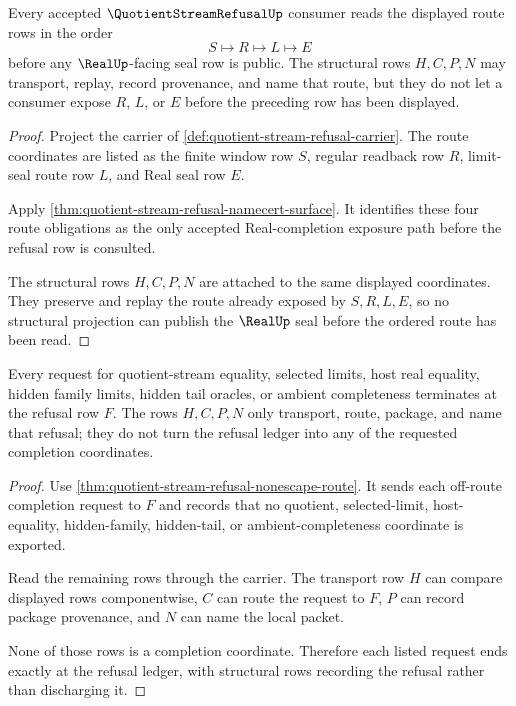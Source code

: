 \begin{theorem}
\label{thm:quotient-stream-refusal-route-exposure}
Every accepted $\QuotientStreamRefusalUp$ consumer reads the displayed route rows in the order
$$
S \longmapsto R \longmapsto L \longmapsto E
$$
before any $\RealUp$-facing seal row is public. The structural rows $H,C,P,N$ may transport, replay, record provenance, and name that route, but they do not let a consumer expose $R$, $L$, or $E$ before the preceding row has been displayed.
\end{theorem}
\begin{proof}
Project the carrier of \autoref{def:quotient-stream-refusal-carrier}. The route coordinates are listed as the finite window row $S$, regular readback row $R$, limit-seal route row $L$, and Real seal row $E$.

Apply \autoref{thm:quotient-stream-refusal-namecert-surface}. It identifies these four route obligations as the only accepted Real-completion exposure path before the refusal row is consulted.

The structural rows $H,C,P,N$ are attached to the same displayed coordinates. They preserve and replay the route already exposed by $S,R,L,E$, so no structural projection can publish the $\RealUp$ seal before the ordered route has been read.
\end{proof}

\begin{theorem}
\label{thm:quotient-stream-refusal-ledger-exactness}
Every request for quotient-stream equality, selected limits, host real equality, hidden family limits, hidden tail oracles, or ambient completeness terminates at the refusal row $F$. The rows $H,C,P,N$ only transport, route, package, and name that refusal; they do not turn the refusal ledger into any of the requested completion coordinates.
\end{theorem}
\begin{proof}
Use \autoref{thm:quotient-stream-refusal-nonescape-route}. It sends each off-route completion request to $F$ and records that no quotient, selected-limit, host-equality, hidden-family, hidden-tail, or ambient-completeness coordinate is exported.

Read the remaining rows through the carrier. The transport row $H$ can compare displayed rows componentwise, $C$ can route the request to $F$, $P$ can record package provenance, and $N$ can name the local packet.

None of those rows is a completion coordinate. Therefore each listed request ends exactly at the refusal ledger, with structural rows recording the refusal rather than discharging it.
\end{proof}

